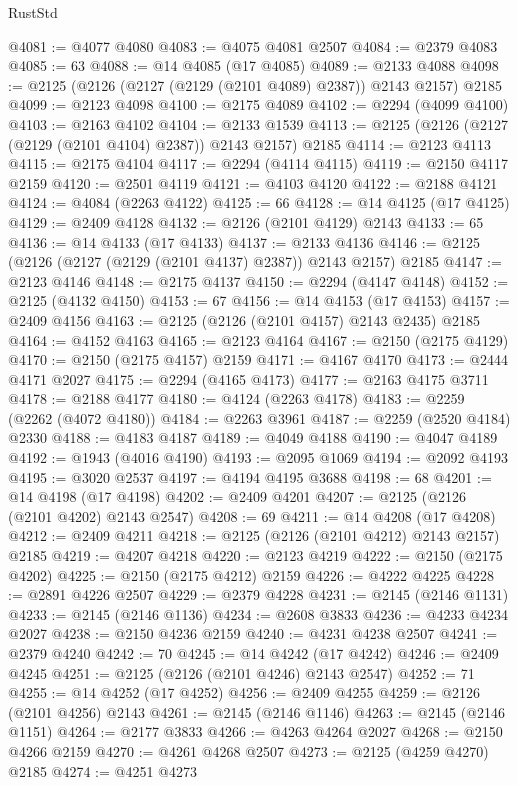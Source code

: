 \begin{lexlean}{RustStd}
\begin{coremodule}
@4081 := @4077 @4080
@4083 := @4075 @4081 @2507
@4084 := @2379 @4083
@4085 := 63
@4088 := @14 @4085 (@17 @4085)
@4089 := @2133 @4088
@4098 := @2125 (@2126 (@2127 (@2129 (@2101 @4089) @2387)) @2143 @2157) @2185
@4099 := @2123 @4098
@4100 := @2175 @4089
@4102 := @2294 (@4099 @4100)
@4103 := @2163 @4102
@4104 := @2133 @1539
@4113 := @2125 (@2126 (@2127 (@2129 (@2101 @4104) @2387)) @2143 @2157) @2185
@4114 := @2123 @4113
@4115 := @2175 @4104
@4117 := @2294 (@4114 @4115)
@4119 := @2150 @4117 @2159
@4120 := @2501 @4119
@4121 := @4103 @4120
@4122 := @2188 @4121
@4124 := @4084 (@2263 @4122)
@4125 := 66
@4128 := @14 @4125 (@17 @4125)
@4129 := @2409 @4128
@4132 := @2126 (@2101 @4129) @2143
@4133 := 65
@4136 := @14 @4133 (@17 @4133)
@4137 := @2133 @4136
@4146 := @2125 (@2126 (@2127 (@2129 (@2101 @4137) @2387)) @2143 @2157) @2185
@4147 := @2123 @4146
@4148 := @2175 @4137
@4150 := @2294 (@4147 @4148)
@4152 := @2125 (@4132 @4150)
@4153 := 67
@4156 := @14 @4153 (@17 @4153)
@4157 := @2409 @4156
@4163 := @2125 (@2126 (@2101 @4157) @2143 @2435) @2185
@4164 := @4152 @4163
@4165 := @2123 @4164
@4167 := @2150 (@2175 @4129)
@4170 := @2150 (@2175 @4157) @2159
@4171 := @4167 @4170
@4173 := @2444 @4171 @2027
@4175 := @2294 (@4165 @4173)
@4177 := @2163 @4175 @3711
@4178 := @2188 @4177
@4180 := @4124 (@2263 @4178)
@4183 := @2259 (@2262 (@4072 @4180))
@4184 := @2263 @3961
@4187 := @2259 (@2520 @4184) @2330
@4188 := @4183 @4187
@4189 := @4049 @4188
@4190 := @4047 @4189
@4192 := @1943 (@4016 @4190)
@4193 := @2095 @1069
@4194 := @2092 @4193
@4195 := @3020 @2537
@4197 := @4194 @4195 @3688
@4198 := 68
@4201 := @14 @4198 (@17 @4198)
@4202 := @2409 @4201
@4207 := @2125 (@2126 (@2101 @4202) @2143 @2547)
@4208 := 69
@4211 := @14 @4208 (@17 @4208)
@4212 := @2409 @4211
@4218 := @2125 (@2126 (@2101 @4212) @2143 @2157) @2185
@4219 := @4207 @4218
@4220 := @2123 @4219
@4222 := @2150 (@2175 @4202)
@4225 := @2150 (@2175 @4212) @2159
@4226 := @4222 @4225
@4228 := @2891 @4226 @2507
@4229 := @2379 @4228
@4231 := @2145 (@2146 @1131)
@4233 := @2145 (@2146 @1136)
@4234 := @2608 @3833
@4236 := @4233 @4234 @2027
@4238 := @2150 @4236 @2159
@4240 := @4231 @4238 @2507
@4241 := @2379 @4240
@4242 := 70
@4245 := @14 @4242 (@17 @4242)
@4246 := @2409 @4245
@4251 := @2125 (@2126 (@2101 @4246) @2143 @2547)
@4252 := 71
@4255 := @14 @4252 (@17 @4252)
@4256 := @2409 @4255
@4259 := @2126 (@2101 @4256) @2143
@4261 := @2145 (@2146 @1146)
@4263 := @2145 (@2146 @1151)
@4264 := @2177 @3833
@4266 := @4263 @4264 @2027
@4268 := @2150 @4266 @2159
@4270 := @4261 @4268 @2507
@4273 := @2125 (@4259 @4270) @2185
@4274 := @4251 @4273

\end{coremodule}
\end{lexlean}
